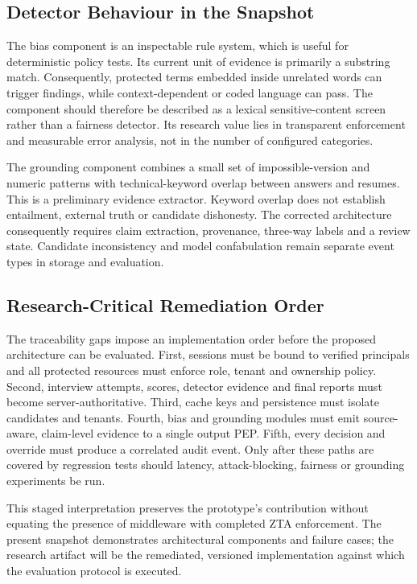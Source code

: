 \documentclass[conference]{IEEEtran}
\begin{document}
\subsection{Detector Behaviour in the Snapshot}

The bias component is an inspectable rule system, which is useful for deterministic policy tests. Its current unit of evidence is primarily a substring match. Consequently, protected terms embedded inside unrelated words can trigger findings, while context-dependent or coded language can pass. The component should therefore be described as a lexical sensitive-content screen rather than a fairness detector. Its research value lies in transparent enforcement and measurable error analysis, not in the number of configured categories.

The grounding component combines a small set of impossible-version and numeric patterns with technical-keyword overlap between answers and resumes. This is a preliminary evidence extractor. Keyword overlap does not establish entailment, external truth or candidate dishonesty. The corrected architecture consequently requires claim extraction, provenance, three-way labels and a review state. Candidate inconsistency and model confabulation remain separate event types in storage and evaluation.

\subsection{Research-Critical Remediation Order}

The traceability gaps impose an implementation order before the proposed architecture can be evaluated. First, sessions must be bound to verified principals and all protected resources must enforce role, tenant and ownership policy. Second, interview attempts, scores, detector evidence and final reports must become server-authoritative. Third, cache keys and persistence must isolate candidates and tenants. Fourth, bias and grounding modules must emit source-aware, claim-level evidence to a single output PEP. Fifth, every decision and override must produce a correlated audit event. Only after these paths are covered by regression tests should latency, attack-blocking, fairness or grounding experiments be run.

This staged interpretation preserves the prototype's contribution without equating the presence of middleware with completed ZTA enforcement. The present snapshot demonstrates architectural components and failure cases; the research artifact will be the remediated, versioned implementation against which the evaluation protocol is executed.
\end{document}
